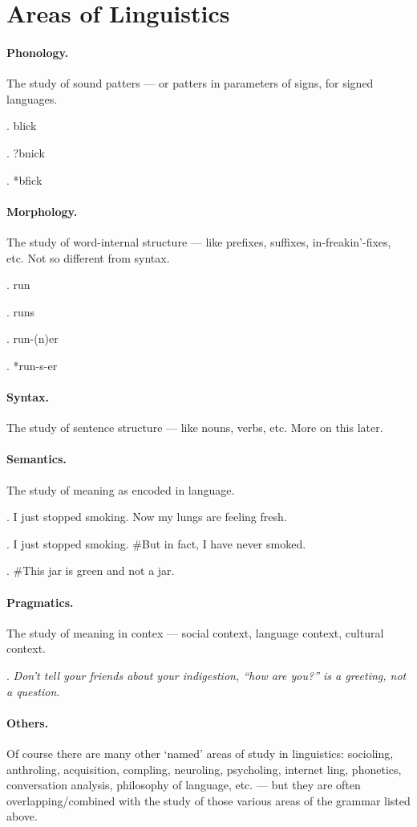 \section{Areas of Linguistics}

\paragraph{Phonology.} The study of sound patters --- or patters in parameters of signs, for signed languages.

\ex. blick

\ex. ?bnick

\ex. *bfick

\paragraph{Morphology.} The study of word-internal structure --- like prefixes, suffixes, in-freakin'-fixes, etc. Not so different from syntax.

\ex. run

\ex. runs

\ex. run-(n)er

\ex. *run-s-er

\paragraph{Syntax.} The study of sentence structure --- like nouns, verbs, etc. More on this later.

\paragraph{Semantics.} The study of meaning as encoded in language.

\ex. I just stopped smoking. Now my lungs are feeling fresh.

\ex. I just stopped smoking. \#But in fact, I have never smoked.

\ex. \#This jar is green and not a jar.

\paragraph{Pragmatics.} The study of meaning in contex --- social context, language context, cultural context.

\ex. \emph{Don't tell your friends about your indigestion, ``how are you?'' is a greeting, not a question.}

\paragraph{Others.} Of course there are many other `named' areas of study in linguistics: socioling, anthroling, acquisition, compling, neuroling, psycholing, internet ling, phonetics, conversation analysis, philosophy of language, etc. --- but they are often overlapping/combined with the study of those various areas of the grammar listed above.

